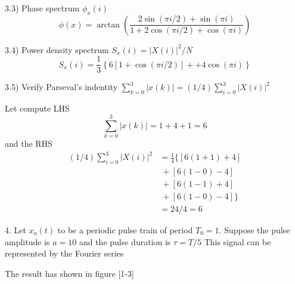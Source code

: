 \documentclass[12pt]{article}
\begin{document}
3.3) Phase spectrum $\phi_x(i)$
\begin{equation*}
    \phi(x) = \arctan\left(\frac{2\sin(\pi i/2)+\sin(\pi i)}{1+2\cos(\pi i/2)+\cos(\pi i)}\right)
\end{equation*}

3.4) Power density spectrum $S_x(i) = |X(i)|^2/N$
\begin{equation*}
    S_x(i) = \frac{1}{3}\left\{6[1+\cos(\pi i/2)] + + 4\cos(\pi i)\right\}
\end{equation*}

3.5) Verify Parseval's indentity $\sum_{k=0}^3|x(k)| = (1/4)\sum_{i=0}^3|X(i)|^2$

Let compute LHS
\begin{equation*}
    \sum_{k=0}^3|x(k)| = 1 + 4 + 1 = 6
\end{equation*}
and the RHS
\begin{equation*}
\begin{split}
    (1/4)\sum_{i=0}^3|X(i)|^2 &= \frac{1}{4}\{ [6 (1+1) + 4] \\
    &\ + [6(1-0)-4] \\
    &\ + [6(1-1)+4] \\
    &\ + [6(1-0)-4]\} \\
    &= 24/4 = 6
\end{split}
\end{equation*}

\vspace{20pt}
4. Let $x_a(t)$ to be a periodic pulse train of period $T_0= 1$.
Suppose the pulse amplitude is $a=10$ and the pulse duration is
$\tau=T/5$ This signal can be represented by
the Fourier series

The result has shown in figure [1-3]
\end{document}
